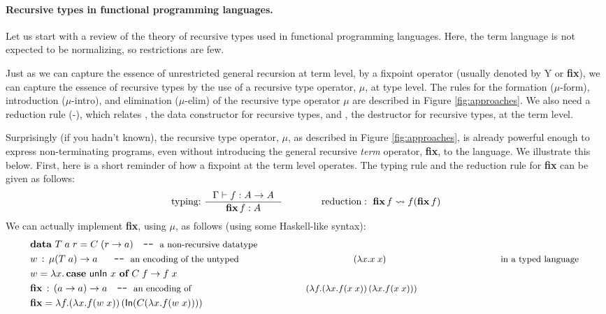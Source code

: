 \paragraph{Recursive types in functional programming languages.}
Let us start with a review of the theory of recursive types used
in functional programming languages. Here, the term
language is not expected to be normalizing, so restrictions are few.

Just as we can capture the essence of unrestricted general recursion at term
level, by a fixpoint operator (usually denoted by \textsf{Y} or \textbf{fix}),
we can capture the essence of recursive types by the
use of a recursive type operator, $\mu$, at type level. 
The rules for the formation {\small($\mu$-form)},
introduction {\small($\mu$-intro)}, and elimination {\small($\mu$-elim)} of
the recursive type operator $\mu$ are described in Figure \ref{fig:approaches}.
We also need a reduction rule {\small(\unIn-\In)}, which relates \In,
the data constructor for recursive types, and \unIn, the destructor for
recursive types, at the term level.

Surprisingly (if you hadn't known), the recursive type operator, $\mu$,
as described in Figure \ref{fig:approaches}, is already powerful enough to
express non-terminating programs, even without introducing the general recursive
{\em term} operator, \textbf{fix}, to the language. We illustrate this below.
First, here is a short reminder of how a fixpoint at the term level operates.
The typing rule and the reduction rule for \textbf{fix} can be given as follows:
\[ \text{typing:}~ \inference{\Gamma |- f : A -> A}{\textbf{fix}\,f : A}
 \qquad\qquad
   \text{reduction}:~ \textbf{fix}\,f \rightsquigarrow f(\textbf{fix}\,f)
\]
We can actually implement \textbf{fix}, using $\mu$, as follows
(using some Haskell-like syntax):
\begin{align*}
& \textbf{data}~T\;a\;r = C\;(r -> a) \quad
          \texttt{-}\texttt{-}~\text{\small a non-recursive datatype} \\
& w \,:\, \mu(T\;a) -> a ~~ \quad
          \texttt{-}\texttt{-}~\text{\small an encoding of the untyped
                                     $(\lambda x.x\;x)$
                                     in a typed language}~ \\
& w = \lambda x . \,\textbf{case}~\mathsf{unIn}~x~\textbf{of}~C\;f -> f\;x \\
& \textbf{fix} \,:\, (a -> a) -> a \quad
          \texttt{-}\texttt{-}~\text{\small an encoding of 
                                     $(\lambda f.(\lambda x.f(x\;x))\,
                                                 (\lambda x.f(x\;x)))$} \\
& \textbf{fix} = \lambda f. (\lambda x. f (w\;x))\,(\mathsf{In}(C(\lambda x. f (w\;x))))
\end{align*}


